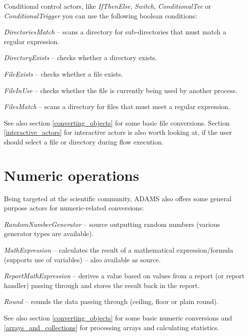 Conditional control actors, like \textit{IfThenElse}, \textit{Switch},
\textit{ConditionalTee} or \textit{ConditionalTrigger} you can use the following
boolean conditions:
\begin{tight_itemize}
	\item \textit{DirectoriesMatch} -- scans a directory for sub-directories
	that must match a regular expression.
	\item \textit{DirectoryExists} -- checks whether a directory exists.
	\item \textit{FileExists} -- checks whether a file exists.
	\item \textit{FileInUse} -- checks whether the file is currently being
	used by another process.
	\item \textit{FilesMatch} -- scans a directory for files that must meet
	a regular expression.
\end{tight_itemize}
See also section \ref{converting_objects} for some basic file conversions.
Section \ref{interactive_actors} for interactive actors is also worth looking
at, if the user should select a file or directory during flow execution.

\clearpage
\section{Numeric operations}
\label{numeric_operations}
Being targeted at the scientific community, ADAMS also offers some general
purpose actors for numeric-related conversions:
\begin{tight_itemize}
	\item \textit{RandomNumberGenerator} -- source outputting random numbers
	(various generator types are available).
	\item \textit{MathExpression} -- calculates the result of a mathematical
	expression/formula (supports use of variables) -- also available as source.
	\item \textit{ReportMathExpression} -- derives a value based on values from a
	report (or report handler) passing through and stores the result back in the
	report.
	\item \textit{Round} -- rounds the data passing through (ceiling, floor or
	plain round).
\end{tight_itemize}
See also section \ref{converting_objects} for some basic numeric conversions
and \ref{arrays_and_collections} for processing arrays and calculating
statistics.

\clearpage
